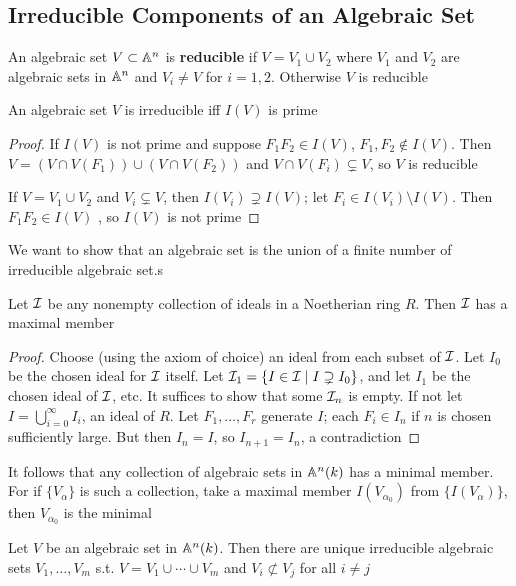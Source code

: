 \documentclass[11pt]{article}
\begin{document}
\subsection{Irreducible Components of an Algebraic Set}
\label{sec:orgd2834fd}
An algebraic set \(V\subset\mathbb{A}^n\) is \textbf{reducible} if \(V=V_1\cup V_2\) where \(V_1\) and \(V_2\) are algebraic sets
in \(\mathbb{A}^n\) and \(V_i\neq V\) for \(i=1,2\). Otherwise \(V\) is reducible

\begin{proposition}[]
\label{prop1.1}
An algebraic set \(V\) is irreducible iff \(I(V)\) is prime
\end{proposition}

\begin{proof}
If \(I(V)\) is not prime and suppose \(F_1F_2\in I(V)\), \(F_1,F_2\notin I(V)\).
Then \(V=(V\cap V(F_1))\cup(V\cap V(F_2))\) and \(V\cap V(F_i)\subsetneq V\), so \(V\) is reducible

If \(V=V_1\cup V_2\) and \(V_i\subsetneq V\), then \(I(V_i)\supsetneq I(V)\); let \(F_i\in I(V_i)\setminus I(V)\).
Then \(F_1F_2\in I(V)\) , so \(I(V)\) is not prime
\end{proof}

We want to show that an algebraic set is the union of a finite number of irreducible algebraic
set.s

\begin{lemma}[]
Let \(\mathcal{I}\) be any nonempty collection of ideals in a Noetherian ring \(R\). Then \(\mathcal{I}\) has a
maximal member
\end{lemma}

\begin{proof}
Choose (using the axiom of choice) an ideal from each subset of \(\mathcal{I}\). Let \(I_0\) be the chosen
ideal for \(\mathcal{I}\) itself. Let \(\mathcal{I}_1=\{I\in\mathcal{I}\mid I\supsetneq I_0\}\), and let \(I_1\) be the chosen ideal
of \(\mathcal{I}\), etc. It suffices to show that some \(\mathcal{I}_n\) is empty. If not let \(I=\bigcup_{i=0}^\infty I_i\),
an ideal of \(R\). Let \(F_1,\dots,F_r\) generate \(I\); each \(F_i\in I_n\) if \(n\) is chosen
sufficiently large. But then \(I_n=I\), so \(I_{n+1}=I_n\), a contradiction
\end{proof}

It follows that any collection of algebraic sets in \(\mathbb{A}^n(k)\) has a minimal member. For
if \(\{V_\alpha\}\) is such a collection, take a maximal member \(I(V_{\alpha_0})\) from \(\{I(V_\alpha)\}\),
then \(V_{\alpha_0}\) is the minimal

\begin{theorem}[]
Let \(V\) be an algebraic set in \(\mathbb{A}^n(k)\). Then there are unique irreducible algebraic
sets \(V_1,\dots,V_m\) s.t. \(V=V_1\cup\cdots\cup V_m\) and \(V_i\not\subset V_j\) for all \(i\neq j\)
\end{theorem}
\end{document}
